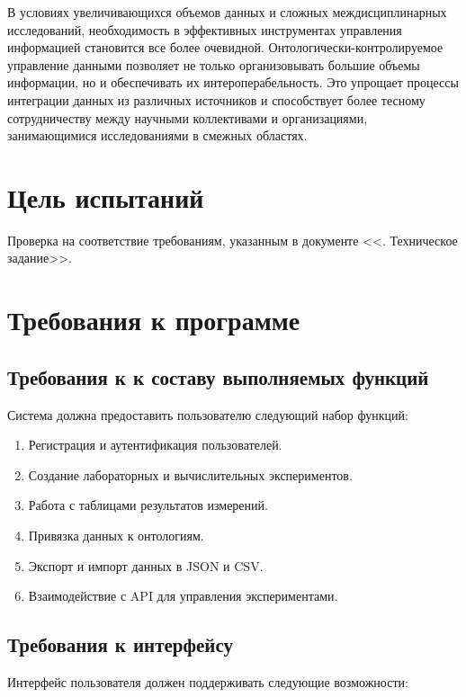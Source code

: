 \documentclass[a4paper,12pt,reqno]{article}
\begin{document}
    В условиях увеличивающихся объемов данных и сложных междисциплинарных исследований, необходимость в эффективных инструментах управления информацией становится все более очевидной. Онтологически-контролируемое управление данными позволяет не только организовывать большие объемы информации, но и обеспечивать их интероперабельность. Это упрощает процессы интеграции данных из различных источников и способствует более тесному сотрудничеству между научными коллективами и организациями, занимающимися исследованиями в смежных областях.
    \newpage

    \section{Цель испытаний}
    Проверка на соответствие требованиям, указанным в документе <<\unskip. Техническое задание>>.

    \section{Требования к программе}

    \subsection{Требования к к составу выполняемых функций}

    Система должна предоставить пользователю следующий набор функций:

    \begin{enumerate}
        \item Регистрация и аутентификация пользователей.
        \item Создание лабораторных и вычислительных экспериментов.
        \item Работа с таблицами результатов измерений.
        \item Привязка данных к онтологиям.
        \item Экспорт и импорт данных в JSON и CSV.
        \item Взаимодействие с API для управления экспериментами.
    \end{enumerate}

    \subsection{Требования к интерфейсу}

    Интерфейс пользователя должен поддерживать следующие возможности:
    
\end{document}
